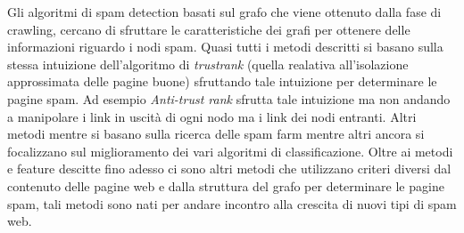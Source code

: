 Gli algoritmi di spam detection basati sul grafo che viene ottenuto dalla fase di crawling, cercano di sfruttare le caratteristiche dei grafi per ottenere delle informazioni riguardo i nodi spam. Quasi tutti i metodi descritti si basano sulla stessa intuizione dell'algoritmo di \textit{trustrank} (quella realativa all'isolazione approssimata delle pagine buone) sfruttando tale intuizione per determinare le pagine spam. Ad esempio \textit{Anti-trust rank} sfrutta tale intuizione ma non andando a manipolare i link in uscità di ogni nodo ma i link dei nodi entranti. Altri metodi mentre si basano sulla ricerca delle spam farm mentre altri ancora si focalizzano sul miglioramento dei vari algoritmi di classificazione. Oltre ai metodi e feature descitte fino adesso ci sono altri metodi che utilizzano criteri diversi dal contenuto delle pagine web e dalla struttura del grafo per determinare le pagine spam, tali metodi sono nati per andare incontro alla crescita di nuovi tipi di spam web.




